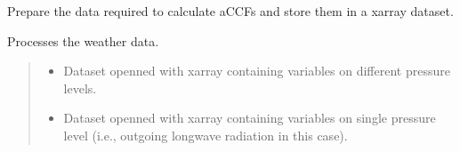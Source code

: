 \documentclass[a4paper,11pt,english]{sphinxmanual}
\begin{document}
\begin{fulllineitems}
\label{\detokenize{modules:envlib.weather_store.WeatherStore}}
\pysigstartsignatures
{}
\pysigstopsignatures
\sphinxAtStartPar
Prepare the data required to calculate aCCFs and store them in a xarray dataset.

\begin{fulllineitems}
\label{\detokenize{modules:envlib.weather_store.WeatherStore.__init__}}
\pysigstartsignatures
{}
\pysigstopsignatures
\sphinxAtStartPar
Processes the weather data.
\begin{quote}\begin{description}
\begin{itemize}
\item {} 
\sphinxAtStartPar
{} \textendash{} Dataset openned with xarray containing variables on different pressure levels.

\item {} 
\sphinxAtStartPar
{} \textendash{} Dataset openned with xarray containing variables on single pressure level (i.e., outgoing longwave radiation in this case).

\end{itemize}

\end{description}\end{quote}

\end{fulllineitems}



\end{fulllineitems}
\end{document}

